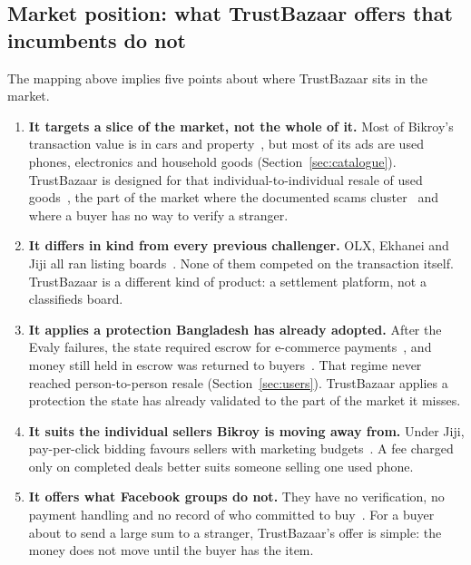 \subsection{Market position: what TrustBazaar offers that incumbents do not}

The mapping above implies five points about where TrustBazaar sits in the market.

\begin{enumerate}[label=\textbf{\arabic*.}]
  \item \textbf{It targets a slice of the market, not the whole of it.} Most of Bikroy's transaction value is in
  cars and property~\cite{fs_jiji}, but most of its ads are used phones, electronics and
  household goods (Section~\ref{sec:catalogue}). TrustBazaar is designed for that
  individual-to-individual resale of used goods~\cite{proposal}, the part of the market where
  the documented scams cluster~\cite{ds_muktagacha,pa_2023} and where a buyer has no way to
  verify a stranger.

  \item \textbf{It differs in kind from every previous challenger.} OLX, Ekhanei and Jiji all ran
  listing boards~\cite{fs_ekhanei,intellinews}. None of them competed on the transaction
  itself. TrustBazaar is a different kind of product: a settlement platform, not a
  classifieds board.

  \item \textbf{It applies a protection Bangladesh has already adopted.} After the Evaly failures, the
  state required escrow for e-commerce payments~\cite{tbs_escrow}, and money still held in
  escrow was returned to buyers~\cite{fe_refund}. That regime never reached person-to-person
  resale (Section~\ref{sec:users}). TrustBazaar applies a protection the state has already
  validated to the part of the market it misses.

  \item \textbf{It suits the individual sellers Bikroy is moving away from.} Under Jiji, pay-per-click
  bidding favours sellers with marketing budgets~\cite{fs_jiji}. A fee charged only on completed
  deals better suits someone selling one used phone.

  \item \textbf{It offers what Facebook groups do not.} They have no verification, no payment handling
  and no record of who committed to buy~\cite{proposal}. For a buyer about to send a large sum to a
  stranger, TrustBazaar's offer is simple: the money does not move until the buyer has
  the item.
\end{enumerate}

